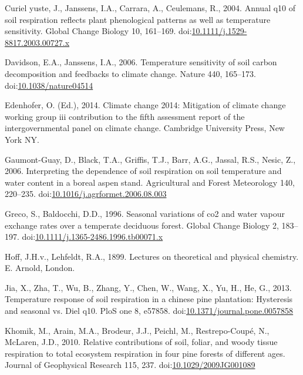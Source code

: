 \documentclass[]{elsarticle} %
\begin{document}
\leavevmode\hypertarget{ref-Curielyuste.2004}{}%
Curiel yuste, J., Janssens, I.A., Carrara, A., Ceulemans, R., 2004.
Annual q10 of soil respiration reflects plant phenological patterns as
well as temperature sensitivity. Global Change Biology 10, 161--169.
doi:\href{https://doi.org/10.1111/j.1529-8817.2003.00727.x}{10.1111/j.1529-8817.2003.00727.x}

\leavevmode\hypertarget{ref-Davidson.2006}{}%
Davidson, E.A., Janssens, I.A., 2006. Temperature sensitivity of soil
carbon decomposition and feedbacks to climate change. Nature 440,
165--173.
doi:\href{https://doi.org/10.1038/nature04514}{10.1038/nature04514}

\leavevmode\hypertarget{ref-Edenhofer.2014}{}%
Edenhofer, O. (Ed.), 2014. Climate change 2014: Mitigation of climate
change working group iii contribution to the fifth assessment report of
the intergovernmental panel on climate change. Cambridge University
Press, New York NY.

\leavevmode\hypertarget{ref-GaumontGuay.2006}{}%
Gaumont-Guay, D., Black, T.A., Griffis, T.J., Barr, A.G., Jassal, R.S.,
Nesic, Z., 2006. Interpreting the dependence of soil respiration on soil
temperature and water content in a boreal aspen stand. Agricultural and
Forest Meteorology 140, 220--235.
doi:\href{https://doi.org/10.1016/j.agrformet.2006.08.003}{10.1016/j.agrformet.2006.08.003}

\leavevmode\hypertarget{ref-Greco.1996}{}%
Greco, S., Baldocchi, D.D., 1996. Seasonal variations of co2 and water
vapour exchange rates over a temperate deciduous forest. Global Change
Biology 2, 183--197.
doi:\href{https://doi.org/10.1111/j.1365-2486.1996.tb00071.x}{10.1111/j.1365-2486.1996.tb00071.x}

\leavevmode\hypertarget{ref-Hoff.1899}{}%
Hoff, J.H.v., Lehfeldt, R.A., 1899. Lectures on theoretical and physical
chemistry. E. Arnold, London.

\leavevmode\hypertarget{ref-Jia.2013}{}%
Jia, X., Zha, T., Wu, B., Zhang, Y., Chen, W., Wang, X., Yu, H., He, G.,
2013. Temperature response of soil respiration in a chinese pine
plantation: Hysteresis and seasonal vs. Diel q10. PloS one 8, e57858.
doi:\href{https://doi.org/10.1371/journal.pone.0057858}{10.1371/journal.pone.0057858}

\leavevmode\hypertarget{ref-Khomik.2010}{}%
Khomik, M., Arain, M.A., Brodeur, J.J., Peichl, M., Restrepo-Coupé, N.,
McLaren, J.D., 2010. Relative contributions of soil, foliar, and woody
tissue respiration to total ecosystem respiration in four pine forests
of different ages. Journal of Geophysical Research 115, 237.
doi:\href{https://doi.org/10.1029/2009JG001089}{10.1029/2009JG001089}
\end{document}
